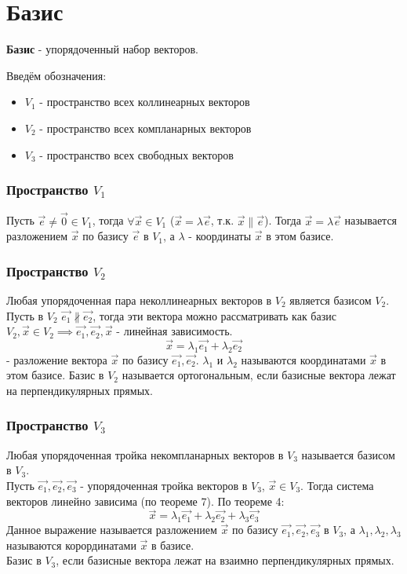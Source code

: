 \section{Базис}

\begin{definition}
  \textbf{Базис} - упорядоченный набор векторов.
\end{definition}

Введём обозначения:
\begin{itemize}
  \item $V_1$ - пространство всех коллинеарных векторов
  \item $V_2$ - пространство всех компланарных векторов
  \item $V_3$ - пространство всех свободных векторов
\end{itemize}

\subsubsection*{Пространство $V_1$}
Пусть $\vec{e} \neq \vec{0} \in V_1$, тогда $\forall \vec{x} \in V_1$ ($\vec{x} = \lambda \vec{e}$, т.к. $\vec{x} \parallel \vec{e}$). Тогда $\vec{x} = \lambda \vec{e}$ называется разложением $\vec{x}$ по базису $\vec{e}$ в $V_1$, а  $\lambda$ - координаты $\vec{x}$ в этом базисе.

\subsubsection*{Пространство $V_2$}
Любая упорядоченная пара неколлинеарных векторов в $V_2$ является базисом $V_2$. \\
Пусть в $V_2$ $\vec{e_1} \not \parallel \vec{e_2}$, тогда эти вектора можно рассматривать как базис $V_2, \vec{x} \in V_2 \implies \vec{e_1}, \vec{e_2}, \vec{x}$ - линейная зависимость. 
\[
  \vec{x} = \lambda_1 \vec{e_1} + \lambda_2 \vec{e_2}
\]
- разложение вектора $\vec{x}$ по базису $\vec{e_1}, \vec{e_2}$. $\lambda_1$ и $\lambda_2$ называются координатами $\vec{x}$ в этом базисе.
Базис в $V_2$ называется ортогональным, если базисные вектора лежат на перпендикулярных прямых.

\subsubsection*{Пространство $V_3$}
Любая упорядоченная тройка некомпланарных векторов в $V_3$ называется базисом в $V_3$.\\
Пусть $\vec{e_1}, \vec{e_2}, \vec{e_3}$ - упорядоченная тройка векторов в $V_3$, $\vec{x} \in V_3$. Тогда система векторов линейно зависима (по теореме 7). По теореме 4:
\[
  \vec{x} = \lambda_1 \vec{e_1} + \lambda_2 \vec{e_2} + \lambda_3 \vec{e_3}
\] 
Данное выражение называется разложением $\vec{x}$ по базису $\vec{e_1}, \vec{e_2}, \vec{e_3}$ в $V_3$, а $\lambda_1, \lambda_2, \lambda_3$ называются корординатами $\vec{x}$ в базисе. \\
Базис в $V_3$, если базисные вектора лежат на взаимно перпендикулярных прямых.

